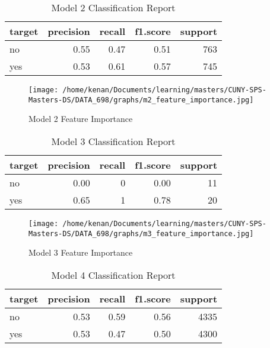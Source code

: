 \documentclass[5p]{elsarticle} %
\begin{document}
\begin{table}

\caption{\label{tab:unnamed-chunk-4}Model 2 Classification Report}
\centering
\begin{tabular}[t]{l|r|r|r|r}
\hline
target & precision & recall & f1.score & support\\
\hline
no & 0.55 & 0.47 & 0.51 & 763\\
\hline
yes & 0.53 & 0.61 & 0.57 & 745\\
\hline
\end{tabular}
\end{table}

\begin{figure}
\hypertarget{id}{%
\centering
\texttt{[image: /home/kenan/Documents/learning/masters/CUNY-SPS-Masters-DS/DATA\_698/graphs/m2\_feature\_importance.jpg]}
\caption{Model 2 Feature Importance}\label{id}
}
\end{figure}

\begin{table}

\caption{\label{tab:unnamed-chunk-5}Model 3 Classification Report}
\centering
\begin{tabular}[t]{l|r|r|r|r}
\hline
target & precision & recall & f1.score & support\\
\hline
no & 0.00 & 0 & 0.00 & 11\\
\hline
yes & 0.65 & 1 & 0.78 & 20\\
\hline
\end{tabular}
\end{table}

\begin{figure}
\hypertarget{id}{%
\centering
\texttt{[image: /home/kenan/Documents/learning/masters/CUNY-SPS-Masters-DS/DATA\_698/graphs/m3\_feature\_importance.jpg]}
\caption{Model 3 Feature Importance}\label{id}
}
\end{figure}

\begin{table}

\caption{\label{tab:unnamed-chunk-6}Model 4 Classification Report}
\centering
\begin{tabular}[t]{l|r|r|r|r}
\hline
target & precision & recall & f1.score & support\\
\hline
no & 0.53 & 0.59 & 0.56 & 4335\\
\hline
yes & 0.53 & 0.47 & 0.50 & 4300\\
\hline
\end{tabular}
\end{table}
\end{document}
